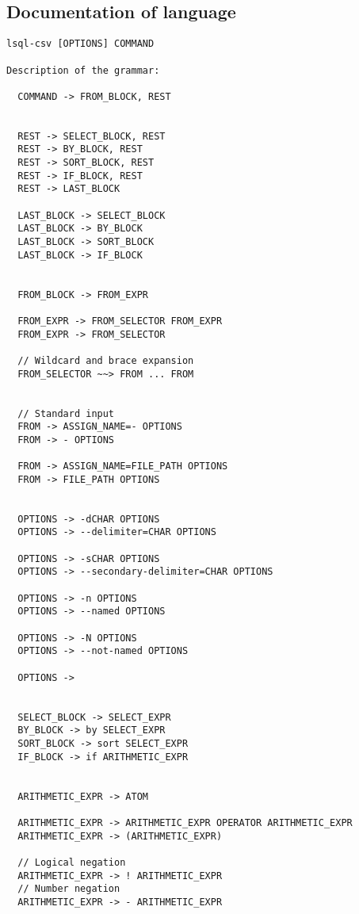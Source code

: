 \subsection{Documentation of language}
\begin{verbatim}
lsql-csv [OPTIONS] COMMAND
      
Description of the grammar:
  
  COMMAND -> FROM_BLOCK, REST

                            
  REST -> SELECT_BLOCK, REST 
  REST -> BY_BLOCK, REST   
  REST -> SORT_BLOCK, REST 
  REST -> IF_BLOCK, REST   
  REST -> LAST_BLOCK

  LAST_BLOCK -> SELECT_BLOCK
  LAST_BLOCK -> BY_BLOCK
  LAST_BLOCK -> SORT_BLOCK
  LAST_BLOCK -> IF_BLOCK

  
  FROM_BLOCK -> FROM_EXPR

  FROM_EXPR -> FROM_SELECTOR FROM_EXPR
  FROM_EXPR -> FROM_SELECTOR

  // Wildcard and brace expansion
  FROM_SELECTOR ~~> FROM ... FROM   


  // Standard input
  FROM -> ASSIGN_NAME=- OPTIONS
  FROM -> - OPTIONS

  FROM -> ASSIGN_NAME=FILE_PATH OPTIONS
  FROM -> FILE_PATH OPTIONS

  
  OPTIONS -> -dCHAR OPTIONS
  OPTIONS -> --delimiter=CHAR OPTIONS

  OPTIONS -> -sCHAR OPTIONS
  OPTIONS -> --secondary-delimiter=CHAR OPTIONS

  OPTIONS -> -n OPTIONS  
  OPTIONS -> --named OPTIONS

  OPTIONS -> -N OPTIONS   
  OPTIONS -> --not-named OPTIONS

  OPTIONS ->
  
  
  SELECT_BLOCK -> SELECT_EXPR
  BY_BLOCK -> by SELECT_EXPR
  SORT_BLOCK -> sort SELECT_EXPR                                                                                                                              
  IF_BLOCK -> if ARITHMETIC_EXPR
  
                                                                                                                 
  ARITHMETIC_EXPR -> ATOM  

  ARITHMETIC_EXPR -> ARITHMETIC_EXPR OPERATOR ARITHMETIC_EXPR
  ARITHMETIC_EXPR -> (ARITHMETIC_EXPR)

  // Logical negation
  ARITHMETIC_EXPR -> ! ARITHMETIC_EXPR
  // Number negation
  ARITHMETIC_EXPR -> - ARITHMETIC_EXPR
  


\end{verbatim}
